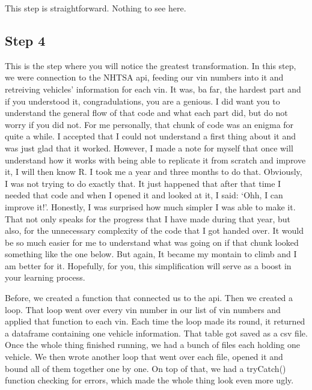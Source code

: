 \documentclass[]{book}
\newenvironment{Shaded}{\begin{snugshade}}{\end{snugshade}}
\newcommand{\CommentTok}[1]{\textcolor[rgb]{0.56,0.35,0.01}{\textit{#1}}}
\newcommand{\KeywordTok}[1]{\textcolor[rgb]{0.13,0.29,0.53}{\textbf{#1}}}
\newcommand{\NormalTok}[1]{#1}
\newcommand{\OperatorTok}[1]{\textcolor[rgb]{0.81,0.36,0.00}{\textbf{#1}}}
\newcommand{\StringTok}[1]{\textcolor[rgb]{0.31,0.60,0.02}{#1}}
\begin{document}
This step is straightforward. Nothing to see here.

\begin{Shaded}
\end{Shaded}

\hypertarget{step-4-2}{%
\subsection{Step 4}\label{step-4-2}}

This is the step where you will notice the greatest transformation. In this step, we were connection to the NHTSA api, feeding our vin numbers into it and retreiving vehicles' information for each vin. It was, ba far, the hardest part and if you understood it, congradulations, you are a genious. I did want you to understand the general flow of that code and what each part did, but do not worry if you did not. For me personally, that chunk of code was an enigma for quite a while. I accepted that I could not understand a first thing about it and was just glad that it worked. However, I made a note for myself that once will understand how it works with being able to replicate it from scratch and improve it, I will then know R. I took me a year and three months to do that. Obviously, I was not trying to do exactly that. It just happened that after that time I needed that code and when I opened it and looked at it, I said: `Ohh, I can improve it!'. Honestly, I was surprised how much simpler I was able to make it. That not only speaks for the progress that I have made during that year, but also, for the unnecessary complexity of the code that I got handed over. It would be so much easier for me to understand what was going on if that chunk looked something like the one below. But again, It became my montain to climb and I am better for it. Hopefully, for you, this simplification will serve as a boost in your learning process.

Before, we created a function that connected us to the api. Then we created a loop. That loop went over every vin number in our list of vin numbers and applied that function to each vin. Each time the loop made its round, it returned a dataframe containing one vehicle information. That table got saved as a csv file. Once the whole thing finished running, we had a bunch of files each holding one vehicle. We then wrote another loop that went over each file, opened it and bound all of them together one by one. On top of that, we had a tryCatch() function checking for errors, which made the whole thing look even more ugly.
\end{document}
